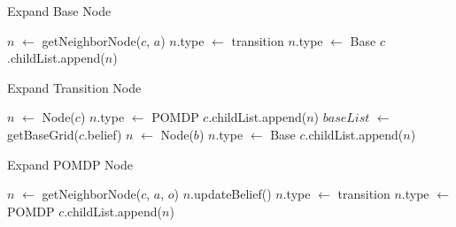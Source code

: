 \documentclass[../main.tex]{subfiles}
\begin{document}
\begin{algorithm}[H]
    \caption{Expand Base Node}
    \label{alg:expand_base}
    \begin{algorithmic}[1]
        \State $n$ $\gets$ getNeighborNode($c$, $a$)
            \State $n$.type $\gets$ transition
        \Else{}
            \State $n$.type $\gets$ Base
        \EndIf
        \State $c$.childList.append($n$)
    \EndFor
    \EndFunction
    \end{algorithmic}
\end{algorithm}
\begin{algorithm}[H]
\caption{Expand Transition Node}
\label{alg:expand_term}
\begin{algorithmic}[1]
    \State $n$ $\gets$ Node($c$)
    \State $n$.type $\gets$ POMDP
    \State $c$.childList.append($n$)
\Else {}
    \State $baseList$ $\gets$ getBaseGrid($c$.belief)
        \State $n$ $\gets$ Node($b$)
        \State $n$.type $\gets$ Base
        \State $c$.childList.append($n$)
    \EndFor
\EndIf
{}
\EndFunction
\end{algorithmic}
\end{algorithm}

\begin{algorithm}[H]
\caption{Expand POMDP Node}
\label{alg:expand_pomdp}
\begin{algorithmic}[1]
    \State $n$ $\gets$ getNeighborNode($c$, $a$, $o$)
    \State $n$.updateBelief()
        \State $n$.type $\gets$ transition
    \Else {}
        \State $n$.type $\gets$ POMDP
    \EndIf
    \State $c$.childList.append($n$)
    \EndFor
\EndFunction
\end{algorithmic}
\end{algorithm}
\end{document}
